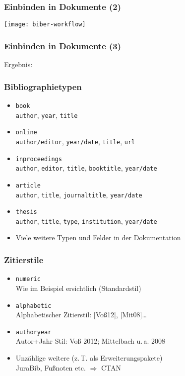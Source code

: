 \begin{frame}
  \frametitle{Einbinden in Dokumente}
  TeX}]{examples/bibliography/basic.tex}
\end{frame}

\begin{frame}
  \frametitle{Einbinden in Dokumente (2)}
  \texttt{[image: biber-workflow]}
\end{frame}

\begin{frame}
  \frametitle{Einbinden in Dokumente (3)}
  Ergebnis:
\end{frame}

\begin{frame}
  \frametitle{Bibliographietypen}
  \begin{itemize}
  \item \texttt{book}\\
    \texttt{author}, \texttt{year}, \texttt{title}
  \item \texttt{online}\\
    \texttt{author/editor}, \texttt{year/date}, \texttt{title},
    \texttt{url}
  \item \texttt{inproceedings}\\
    \texttt{author}, \texttt{editor}, \texttt{title},
    \texttt{booktitle}, \texttt{year/date}
  \item \texttt{article}\\
    \texttt{author}, \texttt{title}, \texttt{journaltitle},
    \texttt{year/date}
  \item \texttt{thesis}\\
    \texttt{author}, \texttt{title}, \texttt{type},
    \texttt{institution}, \texttt{year/date}
  \item Viele weitere Typen und Felder in der Dokumentation
  \end{itemize}
\end{frame}

\begin{frame}
  \frametitle{Zitierstile}
  \begin{itemize}
  \item \texttt{numeric}\\
    Wie im Beispiel ersichtlich (Standardstil)
  \item \texttt{alphabetic}\\
    Alphabetischer Zitierstil: [Voß12], [Mit08]\dots
  \item \texttt{authoryear}\\
    Autor+Jahr Stil: Voß 2012; Mittelbach u.\,a. 2008
  \item Unzählige weitere (z.\,T. als Erweiterungspakete)\\
    JuraBib, Fußnoten etc. $\Rightarrow$ CTAN
  \end{itemize}
\end{frame}

